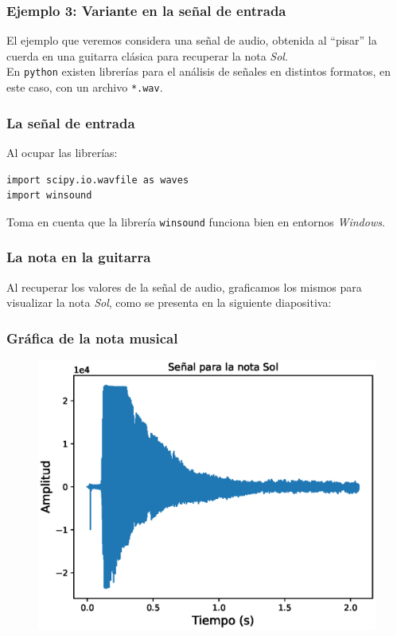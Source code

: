 \documentclass[12pt]{beamer}
\begin{document}
\begin{frame}
\frametitle{Ejemplo 3: Variante en la señal de entrada}
El ejemplo que veremos considera una señal de audio, obtenida al \enquote{pisar} la cuerda en una guitarra clásica para recuperar la nota \emph{Sol}.
\\
\bigskip
\pause
En \texttt{python} existen librerías para el análisis de señales en distintos formatos, en este caso, con un archivo \texttt{*.wav}.
\end{frame}
\begin{frame}[fragile]
\frametitle{La señal de entrada}
Al ocupar las librerías:
\begin{verbatim}
import scipy.io.wavfile as waves
import winsound
\end{verbatim}
Toma en cuenta que la librería \texttt{winsound} funciona bien en entornos \emph{Windows}.
\end{frame}
\begin{frame}
\frametitle{La nota en la guitarra}
Al recuperar los valores de la señal de audio, graficamos los mismos para visualizar la nota \emph{Sol}, como se presenta en la siguiente diapositiva:
\end{frame}
\begin{frame}
\frametitle{Gráfica de la nota musical}
\begin{figure}
    \centering
    \includegraphics[scale=0.6]{Imagenes/DFT_Analisis_Senal_Audio_01.eps}
\end{figure}
\end{frame}
\end{document}
